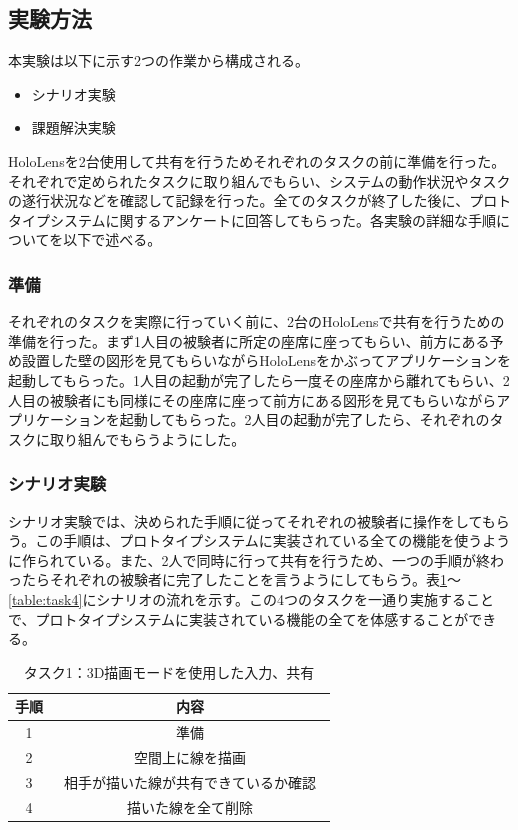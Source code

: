 \documentclass[technicalreport]{ieicej}
\begin{document}
\subsection{実験方法}
本実験は以下に示す2つの作業から構成される。

\begin{itemize}
 \item シナリオ実験
 \item 課題解決実験
\end{itemize}

HoloLensを2台使用して共有を行うためそれぞれのタスクの前に準備を行った。それぞれで定められたタスクに取り組んでもらい、システムの動作状況やタスクの遂行状況などを確認して記録を行った。全てのタスクが終了した後に、プロトタイプシステムに関するアンケートに回答してもらった。各実験の詳細な手順についてを以下で述べる。

\subsubsection{準備}
それぞれのタスクを実際に行っていく前に、2台のHoloLensで共有を行うための準備を行った。まず1人目の被験者に所定の座席に座ってもらい、前方にある予め設置した壁の図形を見てもらいながらHoloLensをかぶってアプリケーションを起動してもらった。1人目の起動が完了したら一度その座席から離れてもらい、2人目の被験者にも同様にその座席に座って前方にある図形を見てもらいながらアプリケーションを起動してもらった。2人目の起動が完了したら、それぞれのタスクに取り組んでもらうようにした。

\subsubsection{シナリオ実験}
シナリオ実験では、決められた手順に従ってそれぞれの被験者に操作をしてもらう。この手順は、プロトタイプシステムに実装されている全ての機能を使うように作られている。また、2人で同時に行って共有を行うため、一つの手順が終わったらそれぞれの被験者に完了したことを言うようにしてもらう。表\ref{table:task1}～\ref{table:task4}にシナリオの流れを示す。この4つのタスクを一通り実施することで、プロトタイプシステムに実装されている機能の全てを体感することができる。

\begin{table}[h]
\caption{タスク1：3D描画モードを使用した入力、共有}
\label{table:task1}
\begin{center}
\begin{tabular}{|c|c|}
\hline
手順 & 内容  \\
\hline\hline
1 & 準備  \\
\hline
2 & 空間上に線を描画  \\
\hline
3 & 相手が描いた線が共有できているか確認　\\
\hline
4 & 描いた線を全て削除  \\
\hline
\end{tabular}
\end{center}
\end{table}
\end{document}
